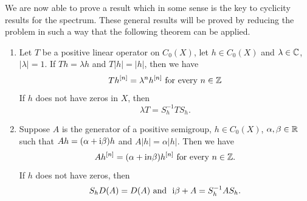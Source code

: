 We are now able to prove a result which in some sense is the key to cyclicity results for the spectrum.
	These general results will be proved by reducing the problem in such a way that the following theorem can be applied.
\begin{theorem}\label{thm:b3-2.4}
\begin{enumerate}	
\item
Let $T$ be a positive linear operator on $C_{0}(X)$, let $h \in C_{0}(X)$ and $\lambda \in \mathbb{C}$, $|\lambda| = 1$.
	If\/ $Th = \lambda h$ and $T|h| = |h|$, then we have 
    \[
    Th^{[n]} = \lambda^{n}h^{[n]} \text{ for every } n \in \mathbb{Z}
    \]
	If\/ $h$ does not have zeros in $X$, then 
	\[
	\lambda T = S_{h}^{-1}TS_{h}.
	\]
\item
Suppose $A$ is the generator of a positive semigroup, $h \in C_{0}(X)$, $\alpha,\beta \in \mathbb{R}$ such that $Ah = (\alpha+\mathrm{i}\beta )h$ and $A|h| = \alpha|h|$. 
	Then we have 
    \[
    Ah^{[n]} = (\alpha+\mathrm{i} n\beta)h^{[n]} \text{ for every } n \in \mathbb{Z} .
    \]
	If\/ $h$ does not have zeros, then 
	\[
	S_{h}D(A) = D(A) \text{ and \ } \mathrm{i}\beta + A = S_{h}^{-1}AS_{h}.
	\]
\end{enumerate}
\end{theorem}
